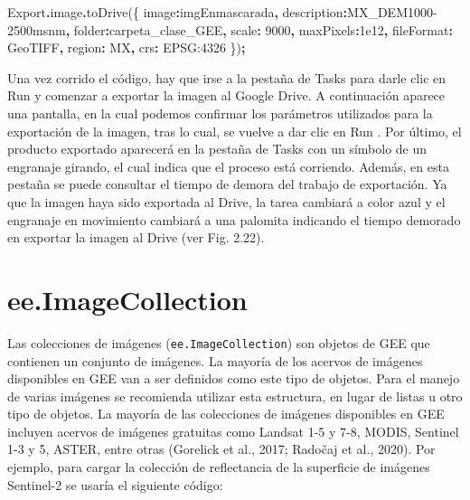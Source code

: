 \documentclass[
  12pt,
  letterpaper,
  twoside]{book}
\newenvironment{Shaded}{\begin{snugshade}}{\end{snugshade}}
\newcommand{\AttributeTok}[1]{\textcolor[rgb]{0.77,0.63,0.00}{#1}}
\newcommand{\DataTypeTok}[1]{\textcolor[rgb]{0.13,0.29,0.53}{#1}}
\newcommand{\DecValTok}[1]{\textcolor[rgb]{0.00,0.00,0.81}{#1}}
\newcommand{\FloatTok}[1]{\textcolor[rgb]{0.00,0.00,0.81}{#1}}
\newcommand{\FunctionTok}[1]{\textcolor[rgb]{0.00,0.00,0.00}{#1}}
\newcommand{\NormalTok}[1]{#1}
\newcommand{\OperatorTok}[1]{\textcolor[rgb]{0.81,0.36,0.00}{\textbf{#1}}}
\newcommand{\StringTok}[1]{\textcolor[rgb]{0.31,0.60,0.02}{#1}}
\begin{document}
\begin{Shaded}
\begin{Highlighting}[]
\NormalTok{Export}\OperatorTok{.}\AttributeTok{image}\OperatorTok{.}\FunctionTok{toDrive}\NormalTok{(\{}
  \DataTypeTok{image}\OperatorTok{:}\NormalTok{imgEnmascarada}\OperatorTok{,} 
  \DataTypeTok{description}\OperatorTok{:}\StringTok{\textquotesingle{}MX\_DEM1000{-}2500msnm\textquotesingle{}}\OperatorTok{,}
  \DataTypeTok{folder}\OperatorTok{:}\StringTok{\textquotesingle{}carpeta\_clase\_GEE\textquotesingle{}}\OperatorTok{,}
  \DataTypeTok{scale}\OperatorTok{:} \DecValTok{9000}\OperatorTok{,}
  \DataTypeTok{maxPixels}\OperatorTok{:}\FloatTok{1e12}\OperatorTok{,}
  \DataTypeTok{fileFormat}\OperatorTok{:} \StringTok{\textquotesingle{}GeoTIFF\textquotesingle{}}\OperatorTok{,}
  \DataTypeTok{region}\OperatorTok{:}\NormalTok{ MX}\OperatorTok{,}
  \DataTypeTok{crs}\OperatorTok{:} \StringTok{\textquotesingle{}EPSG:4326\textquotesingle{}}
\NormalTok{\})}\OperatorTok{;}
\end{Highlighting}
\end{Shaded}

Una vez corrido el código, hay que irse a la pestaña de Tasks para darle clic en Run y comenzar a exportar la imagen al Google Drive. A continuación aparece una pantalla, en la cual podemos confirmar los parámetros utilizados para la exportación de la imagen, tras lo cual, se vuelve a dar clic en Run . Por último, el producto exportado aparecerá en la pestaña de Tasks con un símbolo de un engranaje girando, el cual indica que el proceso está corriendo. Además, en esta pestaña se puede consultar el tiempo de demora del trabajo de exportación. Ya que la imagen haya sido exportada al Drive, la tarea cambiará a color azul y el engranaje en movimiento cambiará a una palomita indicando el tiempo demorado en exportar la imagen al Drive (ver Fig. 2.22).

\newpage

\hypertarget{ee.imagecollection-1}{%
\chapter{ee.ImageCollection}\label{ee.imagecollection-1}}

Las colecciones de imágenes (\texttt{ee.ImageCollection}) son objetos de GEE que contienen un conjunto de imágenes. La mayoría de los acervos de imágenes disponibles en GEE van a ser definidos como este tipo de objetos. Para el manejo de varias imágenes se recomienda utilizar esta estructura, en lugar de listas u otro tipo de objetos. La mayoría de las colecciones de imágenes disponibles en GEE incluyen acervos de imágenes gratuitas como Landsat 1-5 y 7-8, MODIS, Sentinel 1-3 y 5, ASTER, entre otras (Gorelick et al., 2017; Radočaj et al., 2020). Por ejemplo, para cargar la colección de reflectancia de la superficie de imágenes Sentinel-2 se usaría el siguiente código:
\end{document}
